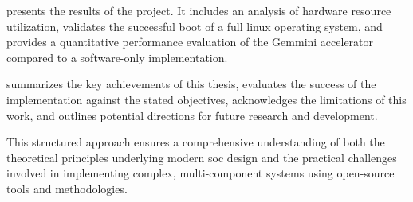 \textbf{} presents the results of the project. It includes an analysis of hardware resource utilization, validates the successful boot of a full \acrshort{linux} operating system, and provides a quantitative performance evaluation of the Gemmini accelerator compared to a software-only implementation.

\textbf{} summarizes the key achievements of this thesis, evaluates the success of the implementation against the stated objectives, acknowledges the limitations of this work, and outlines potential directions for future research and development.

This structured approach ensures a comprehensive understanding of both the theoretical principles underlying modern \acrshort{soc} design and the practical challenges involved in implementing complex, multi-component systems using open-source tools and methodologies.

